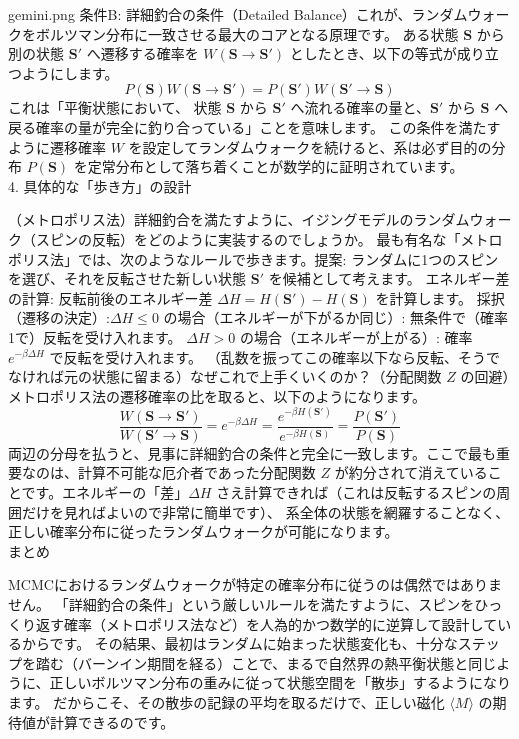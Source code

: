 \documentclass[a4paper,10.5pt]{jlreq}
\begin{document}
\begin{chatbox}{gemini.png}
条件B: 詳細釣合の条件（Detailed Balance）これが、ランダムウォークをボルツマン分布に一致させる最大のコアとなる原理です。
ある状態 $\mathbf{S}$ から別の状態 $\mathbf{S}'$ へ遷移する確率を $W(\mathbf{S} \to \mathbf{S}')$ としたとき、以下の等式が成り立つようにします。
$$P(\mathbf{S}) W(\mathbf{S} \to \mathbf{S}') = P(\mathbf{S}') W(\mathbf{S}' \to \mathbf{S})$$これは「平衡状態において、
状態 $\mathbf{S}$ から $\mathbf{S}'$ へ流れる確率の量と、$\mathbf{S}'$ から $\mathbf{S}$ へ戻る確率の量が完全に釣り合っている」ことを意味します。
この条件を満たすように遷移確率 $W$ を設定してランダムウォークを続けると、系は必ず目的の分布 $P(\mathbf{S})$ を定常分布として落ち着くことが数学的に証明されています。\\

4. 具体的な「歩き方」の設計

（メトロポリス法）詳細釣合を満たすように、イジングモデルのランダムウォーク（スピンの反転）をどのように実装するのでしょうか。
最も有名な「メトロポリス法」では、次のようなルールで歩きます。提案: ランダムに1つのスピンを選び、それを反転させた新しい状態 $\mathbf{S}'$ を候補として考えます。
エネルギー差の計算: 反転前後のエネルギー差 $\Delta H = H(\mathbf{S}') - H(\mathbf{S})$ を計算します。
採択（遷移の決定）:$\Delta H \le 0$ の場合（エネルギーが下がるか同じ）: 無条件で（確率1で）反転を受け入れます。
$\Delta H > 0$ の場合（エネルギーが上がる）: 確率 $e^{-\beta \Delta H}$ で反転を受け入れます。
（乱数を振ってこの確率以下なら反転、そうでなければ元の状態に留まる）なぜこれで上手くいくのか？（分配関数 $Z$ の回避）メトロポリス法の遷移確率の比を取ると、以下のようになります。
$$\frac{W(\mathbf{S} \to \mathbf{S}')}{W(\mathbf{S}' \to \mathbf{S})} = e^{-\beta \Delta H} = \frac{e^{-\beta H(\mathbf{S}')}}{e^{-\beta H(\mathbf{S})}} = \frac{P(\mathbf{S}')}{P(\mathbf{S})}$$両辺の分母を払うと、見事に詳細釣合の条件と完全に一致します。ここで最も重要なのは、計算不可能な厄介者であった分配関数 $Z$ が約分されて消えていることです。エネルギーの「差」$\Delta H$ さえ計算できれば（これは反転するスピンの周囲だけを見ればよいので非常に簡単です）、
系全体の状態を網羅することなく、正しい確率分布に従ったランダムウォークが可能になります。\\

まとめ

MCMCにおけるランダムウォークが特定の確率分布に従うのは偶然ではありません。
「詳細釣合の条件」という厳しいルールを満たすように、スピンをひっくり返す確率（メトロポリス法など）を人為的かつ数学的に逆算して設計しているからです。
その結果、最初はランダムに始まった状態変化も、十分なステップを踏む（バーンイン期間を経る）ことで、まるで自然界の熱平衡状態と同じように、正しいボルツマン分布の重みに従って状態空間を「散歩」するようになります。
だからこそ、その散歩の記録の平均を取るだけで、正しい磁化 $\langle M \rangle$ の期待値が計算できるのです。
\end{chatbox}
\end{document}
